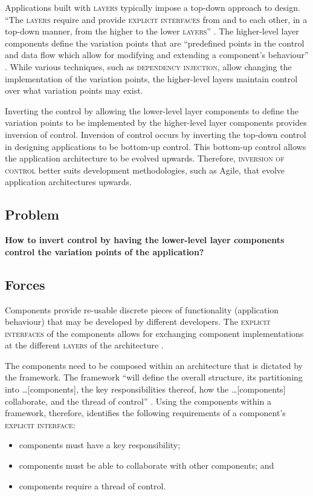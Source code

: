 \documentclass[prodmode]{style/acmlarge}
\begin{document}
Applications built with \textsc{layers} typically impose a top-down approach to
design.  ``The \textsc{layers} require and provide \textsc{explicit interfaces}
from and to each other, in a top-down manner, from the higher to the lower
\textsc{layers}'' \cite[p. 11]{ioc}.  The higher-level layer components
define the variation points that are ``predefined points in the control and data
flow which allow for modifying and extending a component's behaviour'' \cite[p.
5]{ioc}.  While various techniques, such as \textsc{dependency injection}, allow
changing the implementation of the variation points, the higher-level layers
maintain control over what variation points may exist.

Inverting the control by allowing the lower-level layer components to define the
variation points to be implemented by the higher-level layer components provides
inversion of control.  Inversion of control occurs by inverting the top-down
control in designing applications to be bottom-up control.  This bottom-up
control allows the application architecture to be evolved upwards. Therefore,
\textsc{inversion of control} better suits development methodologies, such as
Agile, that evolve application architectures upwards.


\subsection{Problem}

\textbf{How to invert control by having the lower-level layer components control the variation points of the application?}


\subsection{Forces}

Components provide re-usable discrete pieces of functionality (application
behaviour) that may be developed by different developers.  The \textsc{explicit
interfaces} of the components allows for exchanging component implementations at
the different \textsc{layers} of the architecture \cite{ioc}.

The components need to be composed within an architecture that is dictated by
the framework.  The framework ``will define the overall structure, its
partitioning into \ldots [components], the key responsibilities thereof, how the
\ldots [components] collaborate, and the thread of control'' \cite[p.26]{gof}.
Using the components within a framework, therefore, identifies the following
requirements of a component's \textsc{explicit interface}:
\begin{itemize}
  \item components must have a key responsibility;
  \item components must be able to collaborate with other components; and
  \item components require a thread of control.
\end{itemize}
\end{document}
